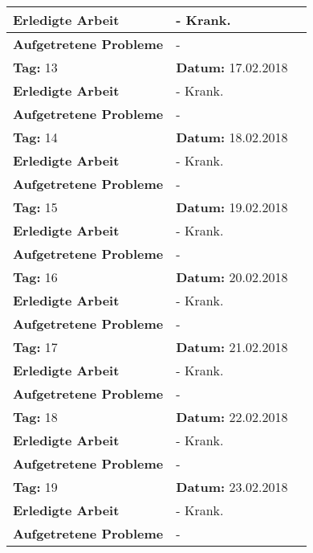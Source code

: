 \begin{longtable}{|p{5cm}|p{5cm}p{6cm}|}
\textbf{Erledigte Arbeit} & \multicolumn{2}{p{11cm}|}{- Krank.} \\ \hline
\textbf{Aufgetretene Probleme} & \multicolumn{2}{p{11cm}|}{-} \\ \hline
\rowcolor{heading}\textbf{Tag:} 13 & \textbf{Datum:} 17.02.2018 & \\ \hline
\textbf{Erledigte Arbeit} & \multicolumn{2}{p{11cm}|}{- Krank.} \\ \hline
\textbf{Aufgetretene Probleme} & \multicolumn{2}{p{11cm}|}{-} \\ \hline
\rowcolor{heading}\textbf{Tag:} 14 & \textbf{Datum:} 18.02.2018 & \\ \hline
\textbf{Erledigte Arbeit} & \multicolumn{2}{p{11cm}|}{- Krank.} \\ \hline
\textbf{Aufgetretene Probleme} & \multicolumn{2}{p{11cm}|}{-} \\ \hline
\rowcolor{heading}\textbf{Tag:} 15 & \textbf{Datum:} 19.02.2018 & \\ \hline
\textbf{Erledigte Arbeit} & \multicolumn{2}{p{11cm}|}{- Krank.} \\ \hline
\textbf{Aufgetretene Probleme} & \multicolumn{2}{p{11cm}|}{-} \\ \hline
\rowcolor{heading}\textbf{Tag:} 16 & \textbf{Datum:} 20.02.2018 & \\ \hline
\textbf{Erledigte Arbeit} & \multicolumn{2}{p{11cm}|}{- Krank.} \\ \hline
\textbf{Aufgetretene Probleme} & \multicolumn{2}{p{11cm}|}{-} \\ \hline
\rowcolor{heading}\textbf{Tag:} 17 & \textbf{Datum:} 21.02.2018 & \\ \hline
\textbf{Erledigte Arbeit} & \multicolumn{2}{p{11cm}|}{- Krank.} \\ \hline
\textbf{Aufgetretene Probleme} & \multicolumn{2}{p{11cm}|}{-} \\ \hline
\rowcolor{heading}\textbf{Tag:} 18 & \textbf{Datum:} 22.02.2018 & \\ \hline
\textbf{Erledigte Arbeit} & \multicolumn{2}{p{11cm}|}{- Krank.} \\ \hline
\textbf{Aufgetretene Probleme} & \multicolumn{2}{p{11cm}|}{-} \\ \hline
\rowcolor{heading}\textbf{Tag:} 19 & \textbf{Datum:} 23.02.2018 & \\ \hline
\textbf{Erledigte Arbeit} & \multicolumn{2}{p{11cm}|}{- Krank.} \\ \hline
\textbf{Aufgetretene Probleme} & \multicolumn{2}{p{11cm}|}{-} \\ \hline

\end{longtable}
